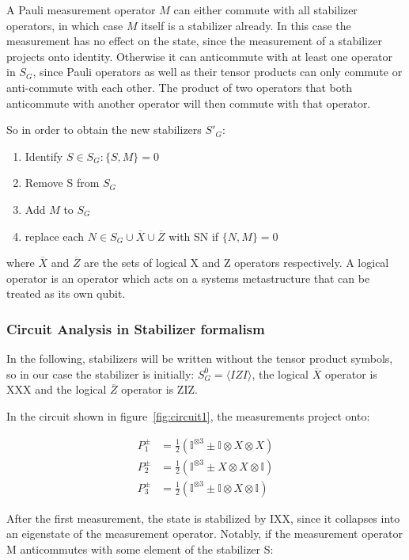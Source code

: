 A Pauli measurement operator $M$ can either commute with all stabilizer
operators, in which case $M$ itself is a stabilizer already. In this case
the measurement has no effect on the state, since the measurement of a
stabilizer projects onto identity.
Otherwise it can anticommute with at
least one operator in $S_{G}$, since Pauli operators as well as
their tensor products can only commute or anti-commute with each
other. The product of two operators that both anticommute with another operator
will then commute with that operator.

So in order to obtain the new stabilizers  $S'_{G}$:
\begin{enumerate}
	\item Identify $S\in S_{G}: \{S,M\}=0$
	\item Remove S from $S_G$
	\item Add $M$ to $S_G$ 
	\item replace each $N \in S_G \cup\overline{X}\cup\overline{Z}$
		with SN if $\{N,M\}=0$
\end{enumerate}
where $\overline{X}$ and $\overline{Z}$ are the sets of 
logical X and Z operators respectively. A logical operator is
an operator which acts on a systems metastructure that can be treated
as its own qubit.

\subsubsection{Circuit Analysis in Stabilizer formalism}

In the following, stabilizers
will be written without the tensor product symbols, so in 
our case the stabilizer is initially: $S_{G}^{0}= \langle IZI \rangle$,
the logical $\overline{X}$ operator is XXX and the logical
$\overline{Z}$ operator is ZIZ.

 In the circuit shown in 
figure~\ref{fig:circuit1}, the measurements project onto:

\begin{align}
	P^{\pm}_{1} &= \frac{1}{2}\left(\mathbb{I}^{\otimes 3} \pm 
	\mathbb{I}\otimes X \otimes X\right) \\
	P^{\pm}_{2} & = \frac{1}{2} \left(\mathbb{I}^{\otimes 3} \pm
	X \otimes X \otimes \mathbb{I}\right) \\
	P^{\pm}_{3} &= \frac{1}{2} \left(\mathbb{I}^{\otimes 3} \pm
	\mathbb{I} \otimes X \otimes \mathbb{I}\right)
\end{align}

After the first measurement, the state is stabilized by 
IXX, since it collapses into an eigenstate of the measurement 
operator. Notably, if the measurement operator M anticommutes
with some element of the stabilizer S:

